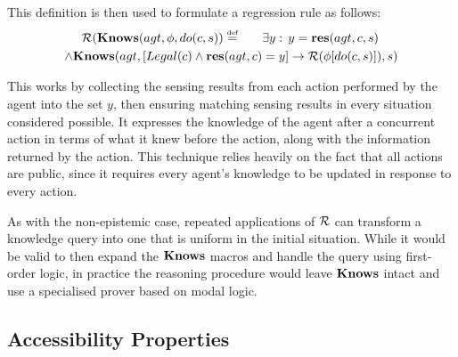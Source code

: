 This definition is then used to formulate a regression rule as follows:\begin{multline}
\mathcal{R}(\mathbf{Knows}(agt,\phi,do(c,s))\stackrel{\mbox{\tiny def}}{=}\,\,\,\,\,\,\,\,\,\,\exists y:\, y=\mathbf{res}(agt,c,s)\,\\
\wedge\mathbf{Knows}(agt,\left[Legal(c)\wedge\mathbf{res}(agt,c)=y\right]\rightarrow\mathcal{R}(\phi[do(c,s)]),s)\label{eq:reg_k_std}\end{multline}


This works by collecting the sensing results from each action performed
by the agent into the set $y$, then ensuring matching sensing results
in every situation considered possible. It expresses the knowledge
of the agent after a concurrent action in terms of what it knew before
the action, along with the information returned by the action. This
technique relies heavily on the fact that all actions are public,
since it requires every agent's knowledge to be updated in response
to every action.

As with the non-epistemic case, repeated applications of $\mathcal{R}$ can
transform a knowledge query into one that is uniform in the initial
situation. While it would be valid to then expand the $\mathbf{Knows}$ macros
and handle the query using first-order logic, in practice the reasoning
procedure would leave $\mathbf{Knows}$ intact and use a specialised prover
based on modal logic.


\subsection{Accessibility Properties\label{sec:Knowledge:Accessibility-Properties}}

